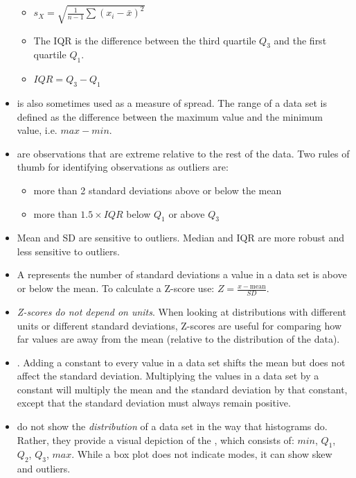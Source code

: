 \begin{itemize}
\begin{itemize}
\item[]   $s_{\scriptscriptstyle{X}}
 = \sqrt{\frac{1}{n-1} \sum{(x_i -  \bar{x})^2}}$ 

\item The IQR is the difference between the third quartile $Q_3$ and the first quartile $Q_1$.

\item[] $IQR = Q_3 - Q_1$ 
\end{itemize}


\item {} is also sometimes used as a measure of spread.  The range of a data set is defined as the difference between the maximum value and the minimum value, i.e. $max - min$.

\item {} are observations that are extreme relative to the rest of the data.  Two rules of thumb for identifying observations as outliers are:
\begin{itemize}\vspace{-1mm}
\setlength{\itemsep}{0mm}
\item more than 2 standard deviations above or below the mean
\item more than $1.5 \times IQR$ below $Q_1$ or above $Q_3$
\end{itemize}
\item Mean and SD are sensitive to outliers.  Median and IQR are more robust and less sensitive to outliers.

\item A  represents the number of standard deviations a value in a data set is above or below the mean.  To calculate a \mbox{Z-score} use: $Z = \frac{x-\text{mean}}{SD}$.  

\item \emph{Z-scores do not depend on units}.  When looking at distributions with different units or different standard deviations, \mbox{Z-scores} are useful for comparing how far values are away from the mean (relative to the distribution of the data). 

\item {}.  Adding a constant to every value in a data set shifts the mean but does not affect the standard deviation. Multiplying the values in a data set by a constant will multiply the mean and the standard deviation by that constant, except that the standard deviation must always remain positive. 

\item {} do not show the \textit{distribution} of a data set in the way that histograms do.
Rather, they provide a visual depiction of the , which consists of: $min$, $Q_1$, $Q_2$, $Q_3$, $max$.  While a box plot does not indicate modes, it can show skew and outliers.  

\end{itemize}



